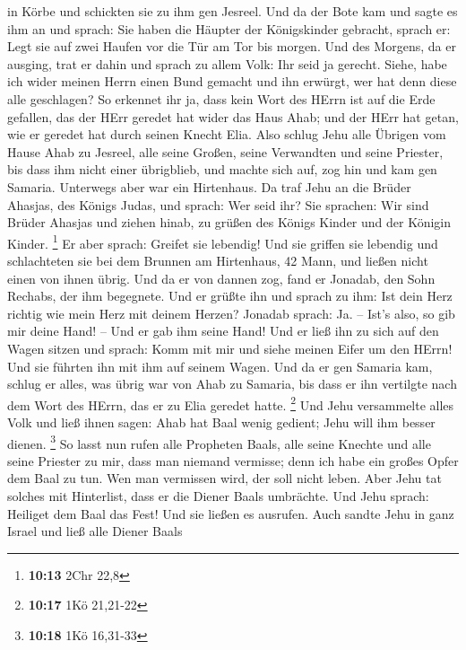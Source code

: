 in Körbe und schickten sie zu ihm gen Jesreel.  Und da der
Bote kam und sagte es ihm an und sprach: Sie haben die Häupter der
Königskinder gebracht, sprach er: Legt sie auf zwei Haufen vor die Tür
am Tor bis morgen.  Und des Morgens, da er ausging, trat er
dahin und sprach zu allem Volk: Ihr seid ja gerecht. Siehe, habe ich
wider meinen Herrn einen Bund gemacht und ihn erwürgt, wer hat denn
diese alle geschlagen?  So erkennet ihr ja, dass kein Wort
des HErrn ist auf die Erde gefallen, das der HErr geredet hat wider das
Haus Ahab; und der HErr hat getan, wie er geredet hat durch seinen
Knecht Elia.  Also schlug Jehu alle Übrigen vom Hause Ahab
zu Jesreel, alle seine Großen, seine Verwandten und seine Priester, bis
dass ihm nicht einer übrigblieb,  und machte sich auf, zog
hin und kam gen Samaria. Unterwegs aber war ein Hirtenhaus.
 Da traf Jehu an die Brüder Ahasjas, des Königs Judas, und
sprach: Wer seid ihr? Sie sprachen: Wir sind Brüder Ahasjas und ziehen
hinab, zu grüßen des Königs Kinder und der Königin Kinder. \footnote{\textbf{10:13}
  2Chr 22,8}  Er aber sprach: Greifet sie lebendig! Und sie
griffen sie lebendig und schlachteten sie bei dem Brunnen am Hirtenhaus,
42 Mann, und ließen nicht einen von ihnen übrig.  Und da er
von dannen zog, fand er Jonadab, den Sohn Rechabs, der ihm begegnete.
Und er grüßte ihn und sprach zu ihm: Ist dein Herz richtig wie mein Herz
mit deinem Herzen? Jonadab sprach: Ja. -- Ist's also, so gib mir deine
Hand! -- Und er gab ihm seine Hand! Und er ließ ihn zu sich auf den
Wagen sitzen  und sprach: Komm mit mir und siehe meinen
Eifer um den HErrn! Und sie führten ihn mit ihm auf seinem Wagen.
 Und da er gen Samaria kam, schlug er alles, was übrig war
von Ahab zu Samaria, bis dass er ihn vertilgte nach dem Wort des HErrn,
das er zu Elia geredet hatte. \footnote{\textbf{10:17} 1Kö 21,21-22}
 Und Jehu versammelte alles Volk und ließ ihnen sagen: Ahab
hat Baal wenig gedient; Jehu will ihm besser dienen. \footnote{\textbf{10:18}
  1Kö 16,31-33}  So lasst nun rufen alle Propheten Baals,
alle seine Knechte und alle seine Priester zu mir, dass man niemand
vermisse; denn ich habe ein großes Opfer dem Baal zu tun. Wen man
vermissen wird, der soll nicht leben. Aber Jehu tat solches mit
Hinterlist, dass er die Diener Baals umbrächte.  Und Jehu
sprach: Heiliget dem Baal das Fest! Und sie ließen es ausrufen.
 Auch sandte Jehu in ganz Israel und ließ alle Diener Baals
